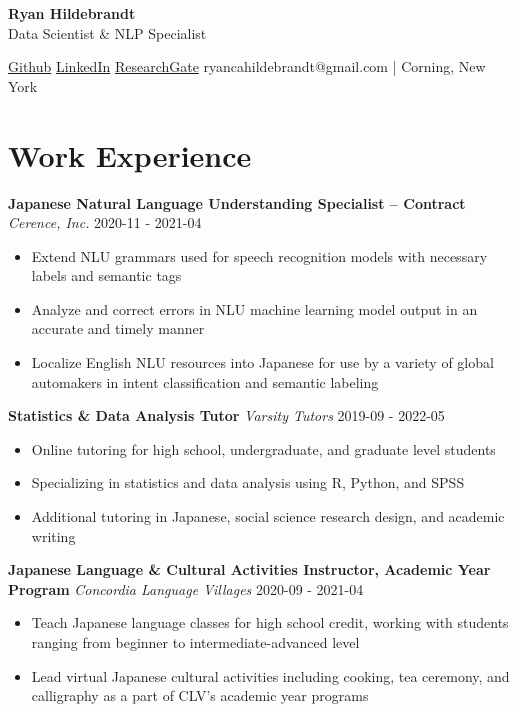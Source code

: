 \documentclass[a4paper,9pt]{extarticle}
\begin{document}
\begin{center}
\textbf{\Large Ryan Hildebrandt}\\[2pt]
Data Scientist \& NLP Specialist

\href{https://github.com/ryancahildebrandt}{Github} \href{https://linkedin.com/in/rcah}{LinkedIn} \href{https://researchgate.net/profile/Ryan-Hildebrandt}{ResearchGate}
ryancahildebrandt@gmail.com | Corning, New York
	\end{center}

\section*{Work Experience}

\noindent
\textbf{Japanese Natural Language Understanding Specialist -- Contract}
\noindent
\textit{Cerence, Inc.} \hfill 2020-11 - 2021-04
\begin{itemize}
\item Extend NLU grammars used for speech recognition models with necessary labels and semantic tags
\item Analyze and correct errors in NLU machine learning model output in an accurate and timely manner
\item Localize English NLU resources into Japanese for use by a variety of global automakers in intent classification and semantic labeling
\end{itemize}

\noindent
\textbf{Statistics \& Data Analysis Tutor}
\noindent
\textit{Varsity Tutors} \hfill 2019-09 - 2022-05
\begin{itemize}
\item Online tutoring for high school, undergraduate, and graduate level students
\item Specializing in statistics and data analysis using R, Python, and SPSS
\item Additional tutoring in Japanese, social science research design, and academic writing
\end{itemize}

\noindent
\textbf{Japanese Language \& Cultural Activities Instructor, Academic Year Program}
\noindent
\textit{Concordia Language Villages} \hfill 2020-09 - 2021-04
\begin{itemize}
\item Teach Japanese language classes for high school credit, working with students ranging from beginner to intermediate-advanced level
\item Lead virtual Japanese cultural activities including cooking, tea ceremony, and calligraphy as a part of CLV's academic year programs
\end{itemize}
\end{document}

